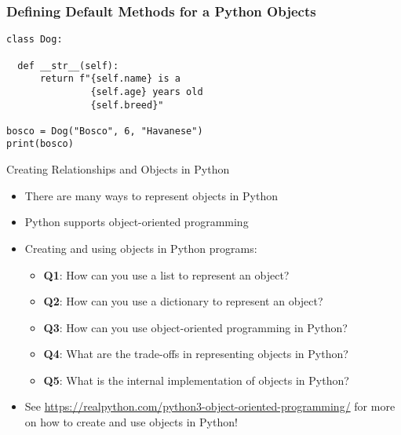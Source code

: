 \documentclass[14pt,aspectratio=169]{beamer}
\begin{document}
%
\begin{frame}[fragile]
  \frametitle{Defining Default Methods for a Python Objects}
  \begin{minipage}{6in}
    \vspace*{.1in}
    \begin{verbatim}
class Dog:

  def __str__(self):
      return f"{self.name} is a
               {self.age} years old
               {self.breed}"

bosco = Dog("Bosco", 6, "Havanese")
print(bosco)

    \end{verbatim}
  \end{minipage}
\end{frame}

%
\begin{frame}{Creating Relationships and Objects in Python}
  \begin{itemize}
    \item There are many ways to represent objects in Python
      \vspace*{-.2in}
    \item Python supports object-oriented programming
      \vspace*{-.2in}
    \item Creating and using objects in Python programs:
      \begin{itemize}
        \item {\bf Q1}: How can you use a list to represent an object?
        \item {\bf Q2}: How can you use a dictionary to represent an object?
        \item {\bf Q3}: How can you use object-oriented programming in Python?
        \item {\bf Q4}: What are the trade-offs in representing objects in
          Python?
        \item {\bf Q5}: What is the internal implementation of objects in
          Python?
      \end{itemize}
      \vspace*{-.2in}
    \item See \url{https://realpython.com/python3-object-oriented-programming/}
      for more on how to create and use objects in Python!
  \end{itemize}
\end{frame}
\end{document}
